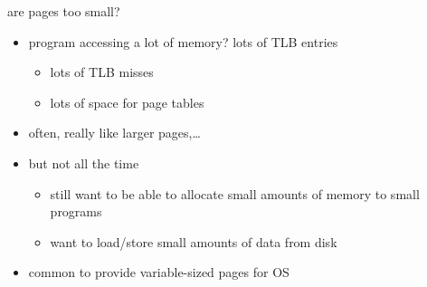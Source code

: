 
\begin{frame}{are pages too small?}
    \begin{itemize}
    \item program accessing a lot of memory? lots of TLB entries
        \begin{itemize}
        \item lots of TLB misses
        \item lots of space for page tables
        \end{itemize}
    \item often, really like larger pages,\ldots
    \item but not all the time
        \begin{itemize}
        \item still want to be able to allocate small amounts of memory to small programs
        \item want to load/store small amounts of data from disk
        \end{itemize}
    \item common to provide variable-sized pages for OS
    \end{itemize}
\end{frame}

